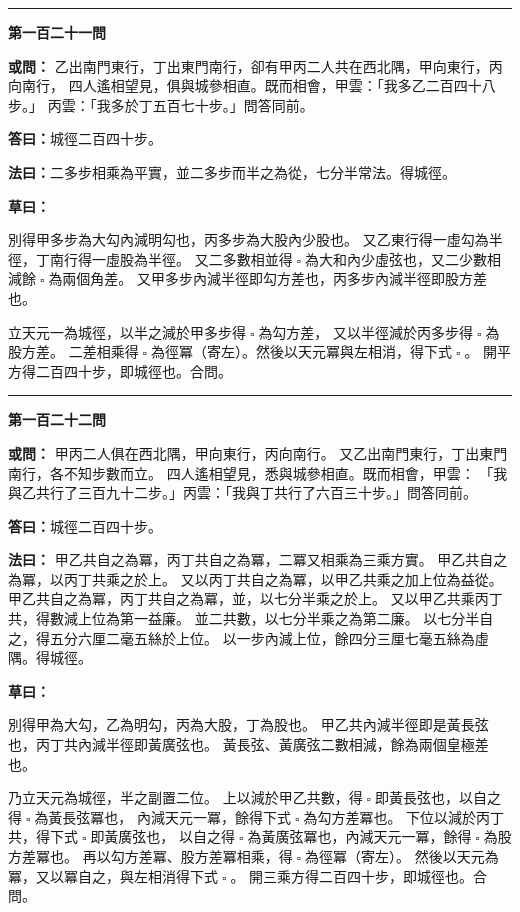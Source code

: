 \documentclass[11pt,a4paper]{article}
\let\origsquare\square
\renewcommand{\square}{\ensuremath{\origsquare}}%
\newcommand{\longline}{\noindent\rule{\textwidth}{0.4pt}}
\newcommand{\owen}[1]{%
  \par\vspace{0.4em}%
  \noindent\textcolor{problemcolor}{\textbf{或問：}}{\tradfont #1}\par\nopagebreak%
}
\newcommand{\fayue}[1]{%
  \par\noindent\textcolor{methodcolor}{\textbf{法曰：}}{\tradfont #1}\par\nopagebreak%
}
\newcommand{\tsaoyue}[1]{%
  \par\noindent\textcolor{workcolor}{\textbf{草曰：}}{\tradfont #1}\par%
}
\newcommand{\dayue}[1]{%
  \par\noindent\textcolor{anscolor}{\textbf{答曰：}}{\tradfont #1}\par\nopagebreak%
}
\newcommand{\wen}[1]{\par\vspace{0.3em}\noindent\textcolor{problemcolor}{\textbf{第#1問}}\par}
\begin{document}
\vspace{0.5cm}
\begin{center}
\longline
\end{center}

\wen{一百二十一}
\owen{%
乙出南門東行，丁出東門南行，卻有甲丙二人共在西北隅，甲向東行，丙向南行，
四人遙相望見，俱與城參相直。既而相會，甲雲：「我多乙二百四十八步。」
丙雲：「我多於丁五百七十步。」問答同前。}
\dayue{城徑二百四十步。}

\fayue{二多步相乘為平實，並二多步而半之為從，七分半常法。得城徑。}

\tsaoyue{%
別得甲多步為大勾內減明勾也，丙多步為大股內少股也。
又乙東行得一虛勾為半徑，丁南行得一虛股為半徑。
又二多數相並得$ \; \square \; $為大和內少虛弦也，又二少數相減餘$ \; \square \; $為兩個角差。
又甲多步內減半徑即勾方差也，丙多步內減半徑即股方差也。

立天元一為城徑，以半之減於甲多步得$ \; \square \; $為勾方差，
又以半徑減於丙多步得$ \; \square \; $為股方差。
二差相乘得$ \; \square \; $為徑冪（寄左）。然後以天元冪與左相消，得下式$ \; \square \; $。
開平方得二百四十步，即城徑也。合問。}

\vspace{0.5cm}
\begin{center}
\longline
\end{center}

\wen{一百二十二}
\owen{%
甲丙二人俱在西北隅，甲向東行，丙向南行。
又乙出南門東行，丁出東門南行，各不知步數而立。
四人遙相望見，悉與城參相直。既而相會，甲雲：
「我與乙共行了三百九十二步。」丙雲：「我與丁共行了六百三十步。」問答同前。}
\dayue{城徑二百四十步。}

\fayue{%
甲乙共自之為冪，丙丁共自之為冪，二冪又相乘為三乘方實。
甲乙共自之為冪，以丙丁共乘之於上。
又以丙丁共自之為冪，以甲乙共乘之加上位為益從。
甲乙共自之為冪，丙丁共自之為冪，並，以七分半乘之於上。
又以甲乙共乘丙丁共，得數減上位為第一益廉。
並二共數，以七分半乘之為第二廉。
以七分半自之，得五分六厘二毫五絲於上位。
以一步內減上位，餘四分三厘七毫五絲為虛隅。得城徑。}

\tsaoyue{%
別得甲為大勾，乙為明勾，丙為大股，丁為股也。
甲乙共內減半徑即是黃長弦也，丙丁共內減半徑即黃廣弦也。
黃長弦、黃廣弦二數相減，餘為兩個皇極差也。

乃立天元為城徑，半之副置二位。
上以減於甲乙共數，得$ \; \square \; $即黃長弦也，以自之得$ \; \square \; $為黃長弦冪也，
內減天元一冪，餘得下式$ \; \square \; $為勾方差冪也。
下位以減於丙丁共，得下式$ \; \square \; $即黃廣弦也，
以自之得$ \; \square \; $為黃廣弦冪也，內減天元一冪，餘得$ \; \square \; $為股方差冪也。
再以勾方差冪、股方差冪相乘，得$ \; \square \; $為徑冪（寄左）。
然後以天元為冪，又以冪自之，與左相消得下式$ \; \square \; $。
開三乘方得二百四十步，即城徑也。合問。}
\end{document}
